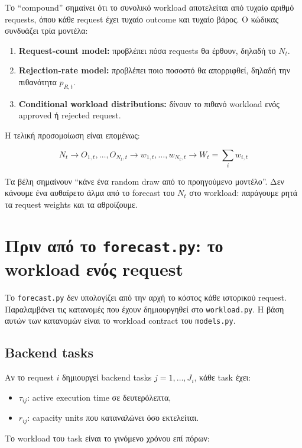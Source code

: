 \documentclass[11pt,a4paper]{article}
\newcommand{\equationnote}[1]{
  \begin{center}
    \colorbox{boxblue}{\parbox{0.92\linewidth}{\begin{equation*}#1\end{equation*}}}
  \end{center}
}
\newcommand{\code}[1]{\texttt{#1}}
\begin{document}
Το ``compound'' σημαίνει ότι το συνολικό workload αποτελείται από τυχαίο
αριθμό requests, όπου κάθε request έχει τυχαίο outcome και τυχαίο βάρος.
Ο κώδικας συνδυάζει τρία μοντέλα:

\begin{enumerate}
  \item \textbf{Request-count model:} προβλέπει πόσα requests θα έρθουν,
        δηλαδή το $N_t$.
  \item \textbf{Rejection-rate model:} προβλέπει ποιο ποσοστό θα απορριφθεί,
        δηλαδή την πιθανότητα $p_{R,t}$.
  \item \textbf{Conditional workload distributions:} δίνουν το πιθανό
        workload ενός approved ή rejected request.
\end{enumerate}

Η τελική προσομοίωση είναι επομένως:

\equationnote{
  N_t \longrightarrow O_{1,t},\ldots,O_{N_t,t}
  \longrightarrow w_{1,t},\ldots,w_{N_t,t}
  \longrightarrow W_t = \sum_i w_{i,t}
}

Τα βέλη σημαίνουν ``κάνε ένα random draw από το προηγούμενο μοντέλο''. Δεν
κάνουμε ένα αυθαίρετο άλμα από το forecast του $N_t$ στο workload: παράγουμε
ρητά τα request weights και τα αθροίζουμε.

\section{Πριν από το \code{forecast.py}: το workload ενός request}

Το \code{forecast.py} δεν υπολογίζει από την αρχή το κόστος κάθε ιστορικού
request. Παραλαμβάνει τις κατανομές που έχουν δημιουργηθεί στο
\code{workload.py}. Η βάση αυτών των κατανομών είναι το workload contract του
\code{models.py}.

\subsection{Backend tasks}

Αν το request $i$ δημιουργεί backend tasks $j=1,\ldots,J_i$, κάθε task έχει:

\begin{itemize}
  \item $\tau_{ij}$: active execution time σε δευτερόλεπτα,
  \item $r_{ij}$: capacity units που καταναλώνει όσο εκτελείται.
\end{itemize}

Το workload του task είναι το γινόμενο χρόνου επί πόρων:
\end{document}
